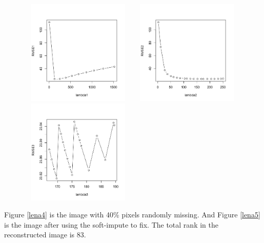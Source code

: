 \documentclass[12pt]{article}
\begin{document}
\begin{figure}[H]
	\centering
	\begin{minipage}[c]{0.32\textwidth}
		\centering
		\includegraphics[angle=0,width=5.5cm,height=5cm]{lena1}
		\caption{}\label{lena1}
	\end{minipage}
	\begin{minipage}[c]{0.32\textwidth}
		\centering
		\includegraphics[angle=0,width=5.5cm,height=5cm]{lena2}
		\caption{}\label{lena2}
	\end{minipage}
	\begin{minipage}[c]{0.32\textwidth}
		\centering
		\includegraphics[angle=0,width=5.5cm,height=5cm]{lena3}
		\caption{}\label{lena3}
	\end{minipage}
\end{figure}


Figure \ref{lena4} is the image with 40\% pixels randomly missing. And Figure \ref{lena5} is the image after using the soft-impute to fix. The total rank in the reconstructed image is 83.
\end{document}
